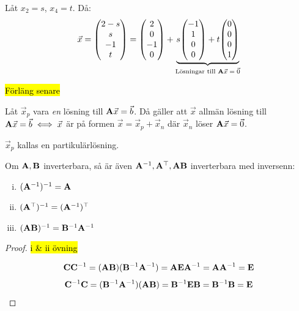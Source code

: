 Låt $x_2=s$, $x_4=t$. Då:
$$
	\vec{x}=\qty(\begin{matrix}
		2-s\\s\\-1\\t
	\end{matrix})=\qty(\begin{matrix}
		2\\0\\-1\\0
	\end{matrix})+\underbrace{s\qty(\begin{matrix}
		-1\\1\\0\\0
	\end{matrix})+t\qty(\begin{matrix}
		0\\0\\0\\1
	\end{matrix})}_\text{Lösningar till $\mathbf{A}\vec{x}=\vec{0}$}
$$

\begin{theorem}
	\hl{Förläng senare}

	Låt $\vec{x}_p$ vara \emph{en} lösning till $\mathbf{A}\vec{x}=\vec{b}$.
	Då gäller att $\vec{x}$ allmän lösning till $\mathbf{A}\vec{x}=\vec{b}\iff\vec{x}$
	är på formen $\vec{x}=\vec{x}_p+\vec{x}_n$ där $\vec{x}_n$ löser
	$\mathbf{A}\vec{x}=\vec{0}$.


	$\vec{x}_p$ kallas en partikulärlösning.

\end{theorem}


\begin{theorem}
	Om $\mathbf{A},\mathbf{B}$ inverterbara, så är även $\mathbf{A}^{-1},\mathbf{A}^\top,\mathbf{AB}$
	inverterbara med inversenn:
	\begin{enumerate}[(i)]
		\item $(\mathbf{A}^{-1})^{-1}=\mathbf{A}$
		\item $(\mathbf{A}^\top)^{-1}=(\mathbf{A}^{-1})^\top$
		\item $(\mathbf{AB})^{-1}=\mathbf{B}^{-1}\mathbf{A}^{-1}$
	\end{enumerate}

	\begin{proof}
		\hl{i \& ii övning}

		$$
			\mathbf{C}\mathbf{C}^{-1}=(\mathbf{A}\mathbf{B})(\mathbf{B}^{-1}\mathbf{A}^{-1})=\mathbf{A}\mathbf{E}\mathbf{A}^{-1}=\mathbf{A}\mathbf{A}^{-1}=\mathbf{E}
		$$
		$$
			\mathbf{C}^{-1}\mathbf{C}=(\mathbf{B}^{-1}\mathbf{A}^{-1})(\mathbf{A}\mathbf{B})=\mathbf{B}^{-1}\mathbf{E}\mathbf{B}=\mathbf{B}^{-1}\mathbf{B}=\mathbf{E}
		$$
	\end{proof}
\end{theorem}

